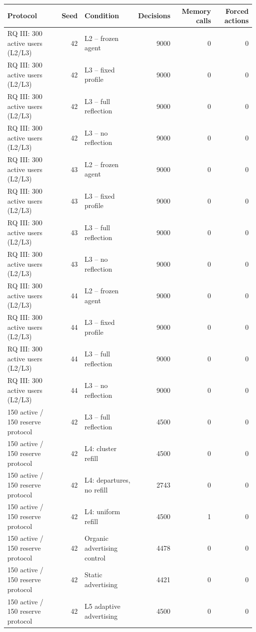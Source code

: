 \begin{table}[htbp!]
\centering
\small
\setlength{\tabcolsep}{3pt}
\renewcommand{\arraystretch}{1.1}
\begin{tabular}{lrlrrr}
\hline
Protocol & Seed & Condition & Decisions & Memory calls & Forced actions \\
\hline
RQ III: 300 active users (L2/L3) & 42 & L2 -- frozen agent & 9000 & 0 & 0 \\
RQ III: 300 active users (L2/L3) & 42 & L3 -- fixed profile & 9000 & 0 & 0 \\
RQ III: 300 active users (L2/L3) & 42 & L3 -- full reflection & 9000 & 0 & 0 \\
RQ III: 300 active users (L2/L3) & 42 & L3 -- no reflection & 9000 & 0 & 0 \\
RQ III: 300 active users (L2/L3) & 43 & L2 -- frozen agent & 9000 & 0 & 0 \\
RQ III: 300 active users (L2/L3) & 43 & L3 -- fixed profile & 9000 & 0 & 0 \\
RQ III: 300 active users (L2/L3) & 43 & L3 -- full reflection & 9000 & 0 & 0 \\
RQ III: 300 active users (L2/L3) & 43 & L3 -- no reflection & 9000 & 0 & 0 \\
RQ III: 300 active users (L2/L3) & 44 & L2 -- frozen agent & 9000 & 0 & 0 \\
RQ III: 300 active users (L2/L3) & 44 & L3 -- fixed profile & 9000 & 0 & 0 \\
RQ III: 300 active users (L2/L3) & 44 & L3 -- full reflection & 9000 & 0 & 0 \\
RQ III: 300 active users (L2/L3) & 44 & L3 -- no reflection & 9000 & 0 & 0 \\
150 active / 150 reserve protocol & 42 & L3 -- full reflection & 4500 & 0 & 0 \\
150 active / 150 reserve protocol & 42 & L4: cluster refill & 4500 & 0 & 0 \\
150 active / 150 reserve protocol & 42 & L4: departures, no refill & 2743 & 0 & 0 \\
150 active / 150 reserve protocol & 42 & L4: uniform refill & 4500 & 1 & 0 \\
150 active / 150 reserve protocol & 42 & Organic advertising control & 4478 & 0 & 0 \\
150 active / 150 reserve protocol & 42 & Static advertising & 4421 & 0 & 0 \\
150 active / 150 reserve protocol & 42 & L5 adaptive advertising & 4500 & 0 & 0 \\

\end{tabular}
\end{table}
